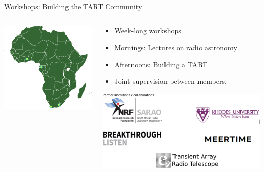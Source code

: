 \documentclass[ignorenonframetext]{beamer}
\begin{document}
\begin{frame}{Workshops: Building the TART Community}
 \begin{columns}
  \begin{column}{0.5\linewidth}
\includegraphics[width=\linewidth]{fig/Africa.pdf}
  \end{column}
  \begin{column}{0.5\linewidth}
  \begin{itemize}
   \item Week-long workshops
   \item Mornings: Lectures on radio astronomy
   \item Afternoons: Building a TART
   \item Joint supervision between members,
  \end{itemize}
  \vspace{1cm}
   \includegraphics[width=\linewidth]{fig/workshop-partners.png}
\end{column}
 \end{columns}
\end{frame}
\end{document}
